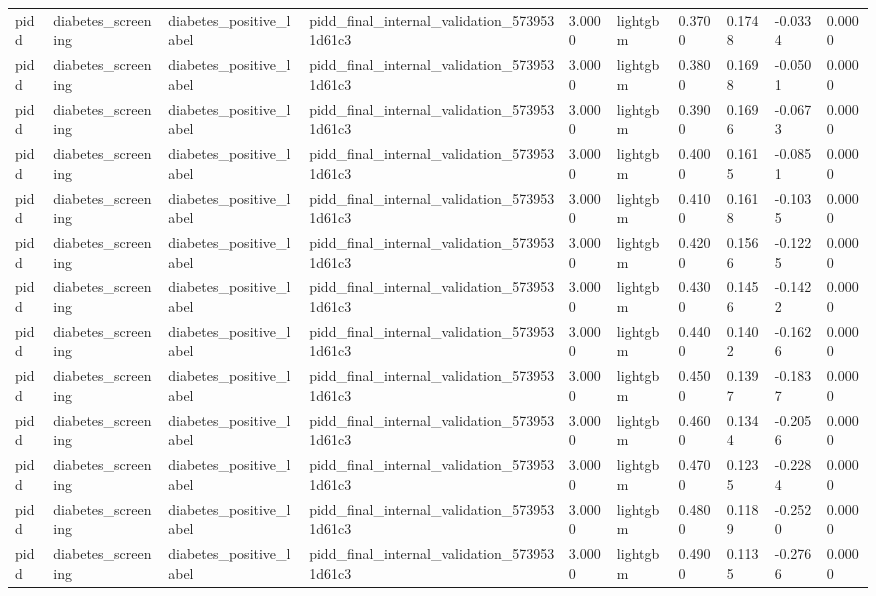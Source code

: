 \begin{tabular}{llllllllll}
pidd & diabetes\_screening & diabetes\_positive\_label & pidd\_final\_internal\_validation\_5739531d61c3 & 3.0000 & lightgbm & 0.3700 & 0.1748 & -0.0334 & 0.0000 \\
pidd & diabetes\_screening & diabetes\_positive\_label & pidd\_final\_internal\_validation\_5739531d61c3 & 3.0000 & lightgbm & 0.3800 & 0.1698 & -0.0501 & 0.0000 \\
pidd & diabetes\_screening & diabetes\_positive\_label & pidd\_final\_internal\_validation\_5739531d61c3 & 3.0000 & lightgbm & 0.3900 & 0.1696 & -0.0673 & 0.0000 \\
pidd & diabetes\_screening & diabetes\_positive\_label & pidd\_final\_internal\_validation\_5739531d61c3 & 3.0000 & lightgbm & 0.4000 & 0.1615 & -0.0851 & 0.0000 \\
pidd & diabetes\_screening & diabetes\_positive\_label & pidd\_final\_internal\_validation\_5739531d61c3 & 3.0000 & lightgbm & 0.4100 & 0.1618 & -0.1035 & 0.0000 \\
pidd & diabetes\_screening & diabetes\_positive\_label & pidd\_final\_internal\_validation\_5739531d61c3 & 3.0000 & lightgbm & 0.4200 & 0.1566 & -0.1225 & 0.0000 \\
pidd & diabetes\_screening & diabetes\_positive\_label & pidd\_final\_internal\_validation\_5739531d61c3 & 3.0000 & lightgbm & 0.4300 & 0.1456 & -0.1422 & 0.0000 \\
pidd & diabetes\_screening & diabetes\_positive\_label & pidd\_final\_internal\_validation\_5739531d61c3 & 3.0000 & lightgbm & 0.4400 & 0.1402 & -0.1626 & 0.0000 \\
pidd & diabetes\_screening & diabetes\_positive\_label & pidd\_final\_internal\_validation\_5739531d61c3 & 3.0000 & lightgbm & 0.4500 & 0.1397 & -0.1837 & 0.0000 \\
pidd & diabetes\_screening & diabetes\_positive\_label & pidd\_final\_internal\_validation\_5739531d61c3 & 3.0000 & lightgbm & 0.4600 & 0.1344 & -0.2056 & 0.0000 \\
pidd & diabetes\_screening & diabetes\_positive\_label & pidd\_final\_internal\_validation\_5739531d61c3 & 3.0000 & lightgbm & 0.4700 & 0.1235 & -0.2284 & 0.0000 \\
pidd & diabetes\_screening & diabetes\_positive\_label & pidd\_final\_internal\_validation\_5739531d61c3 & 3.0000 & lightgbm & 0.4800 & 0.1189 & -0.2520 & 0.0000 \\
pidd & diabetes\_screening & diabetes\_positive\_label & pidd\_final\_internal\_validation\_5739531d61c3 & 3.0000 & lightgbm & 0.4900 & 0.1135 & -0.2766 & 0.0000 \\

\end{tabular}

